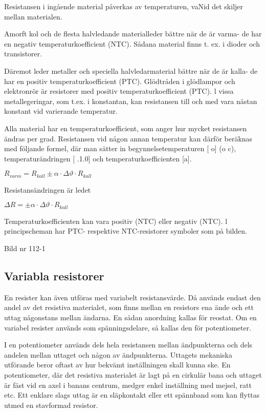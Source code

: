 Resistansen i ingående material påverkas
av temperaturen, vaNid det skiljer mellan
materialen.

Amorft kol och de flesta halvledande
materialleder bättre när de är varma- de har
en negativ temperaturkoefficient (NTC). Sådana material finns t. ex. i dioder och transistorer.

Däremot leder metaller och speciella
halvledarmaterial bättre när de är kalla- de
har en positiv temperaturkoefficient (PTC).
Glödtråden i glödlampor och elektronrör är
resistorer med positiv temperaturkoefficient
(PTC). l vissa metallegeringar, som t.ex. i
konstantan, kan resistansen till och med
vara nästan konstant vid varierande temperatur.

Alla material har en temperaturkoefficient,
som anger hur mycket resistansen ändras
per grad. Resistansen vid någon annan temperatur kan därför beräknas med följande
formel, där man sätter in begynnelsetemperaturen [ o] (o c), temperaturändringen [ .1.0]
och temperaturkoefficienten [a].

\(R_{varm} = R_{kall} \pm \alpha \cdot \Delta \vartheta \cdot R_{kall}\)

Resistansändringen är ledet

\( \Delta R = \pm \alpha \cdot \Delta \vartheta \cdot R_{kall}\)

Temperaturkoefficienten kan vara positiv (NTC) eller negativ (NTC).
l principscheman har PTC- respektive NTC-resistorer symboler som på bilden.

Bild nr 112-1

\subsection{Variabla resistorer}
En resister kan även utföras med variabelt resistansvärde. Då används endast
den andel av det resistiva materialet, som finns mellan en resistors ena ände och ett uttag
någonstans mellan ändarna. En sådan anordning kallas för reostat. Om en variabel
resister används som spänningsdelare, så kallas den för potentiometer.

I en potentiometer används dels hela resistansen mellan ändpunkterna och dels
andelen mellan uttaget och någon av ändpunkterna.
Uttagets mekaniska utförande beror oftast av hur bekvämt inställningen skall kunna
ske. En potentiometer, där det resistiva materialet är lagt på en cirkulär bana och
uttaget är fäst vid en axel i banans centrum, medger enkel inställning med mejsel, ratt
etc. Ett enklare slags uttag är en släpkontakt eller ett spännband som kan flyttas utmed en
stavformad resistor.

